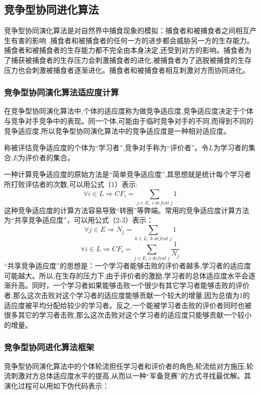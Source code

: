 \documentclass[a4paper]{article}
\begin{document}
    \subsection{竞争型协同进化算法}
    
    竞争型协同演化算法是对自然界中捕食现象的模拟：捕食者和被捕食者之间相互产生有害的影响 ,捕食者和被捕食者的任何一方的进步都会威胁另一方的生存能力。捕食者和被捕食者的生存能力都不完全由本身决定,还受到对方的影响\cite{li}。捕食者为了捕获被捕食者的生存压力会刺激捕食者的进化,被捕食者为了逃脱被捕食的生存压力也会刺激被捕食者逐渐进化。捕食者和被捕食者相互刺激对方而协同进化。

    \subsubsection{竞争型协同演化算法适应度计算}

    在竞争型协同演化算法中,个体的适应度称为做竞争适应度,竞争适应度决定于个体与竞争对手竞争中的表现。同一个体,可能由于临时竞争对手的不同,而得到不同的竞争适应度,所以竞争型协同演化算法中的竞争适应度是一种相对适应度。

    称被评估竞争适应度的个体为“学习者”,竞争对手称为“评价者”。令$L$为学习者的集合,$E$为评价者的集合。

    一种计算竞争适应度的原始方法是“简单竞争适应度”,其思想就是统计每个学习者所打败评估者的次数,可以用公式（1）表示:
    \begin{equation}
		\forall i \in L \Rightarrow CF_i = \sum_{j \in E,\;i\;defeat\;j}1
    \end{equation}
    这种竞争适应度的计算方法容易导致“转圈”等弊端。常用的竞争适应度计算方法为“共享竞争适应度”，可以用公式（2-3）表示：
    \begin{equation}
		\forall j \in E \Rightarrow N_j = \sum_{k \in L,\;k\;defeat\;j}1
    \end{equation}
    \begin{equation}
		\forall i \in L \Rightarrow CF_i = \sum_{j \in E,\;i\;defeat\;j}\frac{1}{N_j}
    \end{equation}
    “共享竞争适应度”的思想是：一个学习者能够击败的评价者越多,学习者的适应度可能越大。所以,在生存的压力下,由于评价者的激励,学习者的总体适应度水平会逐渐升高。同时，一个学习者如果能够击败一个很少有其它学习者能够击败的评价者,那么这次击败对这个学习者的适应度能够贡献一个较大的增量,因为总值为1的适应度被平均分配给较少的学习者。反之,一个能被学习者击败的评价者同时也被很多其它的学习者击败,那么这次击败对这个学习者的适应度只能够贡献一个较小的增量。

    \subsubsection{竞争型协同进化算法框架}
    竞争型协同演化算法中的个体轮流担任学习者和评价者的角色,轮流给对方施压,轮流刺激对方总体适应度水平的提高,从而以一种“军备竞赛”的方式寻找最优解。其演化过程可以用如下伪代码表示：
\end{document}
